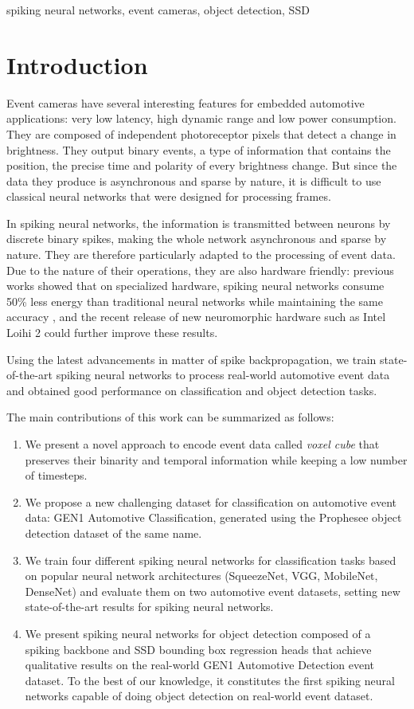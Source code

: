 \documentclass[conference]{IEEEtran}
\begin{document}
\begin{IEEEkeywords}
spiking neural networks, event cameras, object detection, SSD
\end{IEEEkeywords}


\section{Introduction}
Event cameras have several interesting features for embedded automotive applications: very low latency, high dynamic range and low power consumption. They are composed of independent photoreceptor pixels that detect a change in brightness. They output binary events, a type of information that contains the position, the precise time and polarity of every brightness change. But since the data they produce is asynchronous and sparse by nature, it is difficult to use classical neural networks that were designed for processing frames.

In spiking neural networks, the information is transmitted between neurons by discrete binary spikes, making the whole network asynchronous and sparse by nature. They are therefore particularly adapted to the processing of event data. Due to the nature of their operations, they are also hardware friendly: previous works showed that on specialized hardware, spiking neural networks consume 50\% less energy than traditional neural networks while maintaining the same accuracy \cite{lyesijcnn}, and the recent release of new neuromorphic hardware such as Intel Loihi 2 \cite{loihi2} could further improve these results.

Using the latest advancements in matter of spike backpropagation, we train state-of-the-art spiking neural networks to process real-world automotive event data and obtained good performance on classification and object detection tasks. 

The main contributions of this work can be summarized as follows:
\begin{enumerate}
    \item We present a novel approach to encode event data called \textit{voxel cube} that preserves their binarity and temporal information while keeping a low number of timesteps.
    \item We propose a new challenging dataset for classification on automotive event data: GEN1 Automotive Classification, generated using the Prophesee object detection dataset of the same name.
    \item We train four different spiking neural networks for classification tasks based on popular neural network architectures (SqueezeNet, VGG, MobileNet, DenseNet) and evaluate them on two automotive event datasets, setting new state-of-the-art results for spiking neural networks. \item We present spiking neural networks for object detection composed of a spiking backbone and SSD bounding box regression heads that achieve qualitative results on the real-world GEN1 Automotive Detection event dataset.
    To the best of our knowledge, it constitutes the first spiking neural networks capable of doing object detection on real-world event dataset. 
\end{enumerate}
\end{document}
